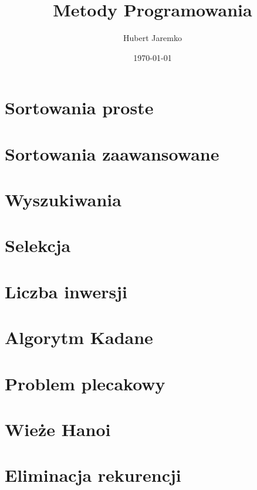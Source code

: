 \documentclass[a5paper, 4pt]{article}
\title{
\vskip 2cm
  Metody Programowania}
\author{Hubert Jaremko}
\date{\today}
\begin{document}
    \maketitle
    \pagebreak
    \tableofcontents
    \pagebreak

    \section{Sortowania proste}
    

    \section{Sortowania zaawansowane}
    

    \section{Wyszukiwania}
    

    \section{Selekcja}
    

    \pagebreak

    \section{Liczba inwersji}
    

    \section{Algorytm Kadane}
    

    \section{Problem plecakowy}
    

    \section{Wieże Hanoi}
    

    \section{Eliminacja rekurencji}
    
\end{document}
